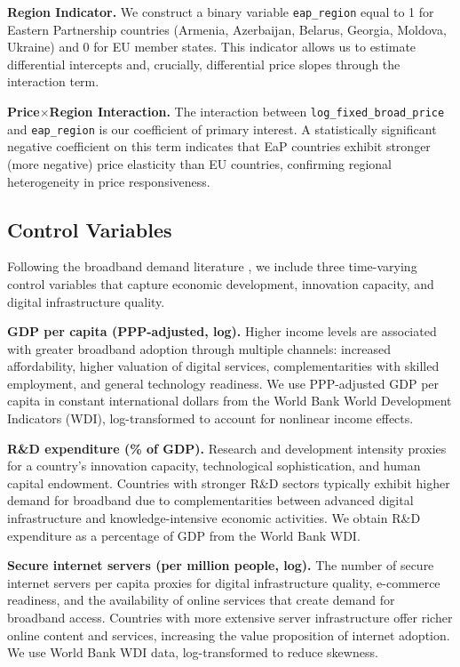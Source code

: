 \documentclass[12pt,review]{elsarticle}
\begin{document}
\textbf{Region Indicator.} We construct a binary variable \texttt{eap\_region} equal to 1 for Eastern Partnership countries (Armenia, Azerbaijan, Belarus, Georgia, Moldova, Ukraine) and 0 for EU member states. This indicator allows us to estimate differential intercepts and, crucially, differential price slopes through the interaction term.

\textbf{Price$\times$Region Interaction.} The interaction between \texttt{log\_fixed\_broad\_price} and \texttt{eap\_region} is our coefficient of primary interest. A statistically significant negative coefficient on this term indicates that EaP countries exhibit stronger (more negative) price elasticity than EU countries, confirming regional heterogeneity in price responsiveness.

\subsection{Control Variables}

Following the broadband demand literature \citep{cardona2009demand, galperin2017price}, we include three time-varying control variables that capture economic development, innovation capacity, and digital infrastructure quality.

\textbf{GDP per capita (PPP-adjusted, log).} Higher income levels are associated with greater broadband adoption through multiple channels: increased affordability, higher valuation of digital services, complementarities with skilled employment, and general technology readiness. We use PPP-adjusted GDP per capita in constant international dollars from the World Bank World Development Indicators (WDI), log-transformed to account for nonlinear income effects.

\textbf{R\&D expenditure (\% of GDP).} Research and development intensity proxies for a country's innovation capacity, technological sophistication, and human capital endowment. Countries with stronger R\&D sectors typically exhibit higher demand for broadband due to complementarities between advanced digital infrastructure and knowledge-intensive economic activities. We obtain R\&D expenditure as a percentage of GDP from the World Bank WDI.

\textbf{Secure internet servers (per million people, log).} The number of secure internet servers per capita proxies for digital infrastructure quality, e-commerce readiness, and the availability of online services that create demand for broadband access. Countries with more extensive server infrastructure offer richer online content and services, increasing the value proposition of internet adoption. We use World Bank WDI data, log-transformed to reduce skewness.
\end{document}

